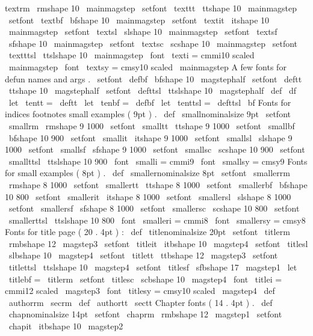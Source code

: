{{textrm
\
rmshape
{
10
}
{
\
mainmagstep
}
\
setfont
\
texttt
\
ttshape
{
10
}
{
\
mainmagstep
}
\
setfont
\
textbf
\
bfshape
{
10
}
{
\
mainmagstep
}
\
setfont
\
textit
\
itshape
{
10
}
{
\
mainmagstep
}
\
setfont
\
textsl
\
slshape
{
10
}
{
\
mainmagstep
}
\
setfont
\
textsf
\
sfshape
{
10
}
{
\
mainmagstep
}
\
setfont
\
textsc
\
scshape
{
10
}
{
\
mainmagstep
}
\
setfont
\
textttsl
\
ttslshape
{
10
}
{
\
mainmagstep
}
\
font
\
texti
=
cmmi10
scaled
\
mainmagstep
\
font
\
textsy
=
cmsy10
scaled
\
mainmagstep
%
A
few
fonts
for
defun
names
and
args
.
\
setfont
\
defbf
\
bfshape
{
10
}
{
\
magstephalf
}
\
setfont
\
deftt
\
ttshape
{
10
}
{
\
magstephalf
}
\
setfont
\
defttsl
\
ttslshape
{
10
}
{
\
magstephalf
}
\
def
\
df
{
\
let
\
tentt
=
\
deftt
\
let
\
tenbf
=
\
defbf
\
let
\
tenttsl
=
\
defttsl
\
bf
}
%
Fonts
for
indices
footnotes
small
examples
(
9pt
)
.
\
def
\
smallnominalsize
{
9pt
}
\
setfont
\
smallrm
\
rmshape
{
9
}
{
1000
}
\
setfont
\
smalltt
\
ttshape
{
9
}
{
1000
}
\
setfont
\
smallbf
\
bfshape
{
10
}
{
900
}
\
setfont
\
smallit
\
itshape
{
9
}
{
1000
}
\
setfont
\
smallsl
\
slshape
{
9
}
{
1000
}
\
setfont
\
smallsf
\
sfshape
{
9
}
{
1000
}
\
setfont
\
smallsc
\
scshape
{
10
}
{
900
}
\
setfont
\
smallttsl
\
ttslshape
{
10
}
{
900
}
\
font
\
smalli
=
cmmi9
\
font
\
smallsy
=
cmsy9
%
Fonts
for
small
examples
(
8pt
)
.
\
def
\
smallernominalsize
{
8pt
}
\
setfont
\
smallerrm
\
rmshape
{
8
}
{
1000
}
\
setfont
\
smallertt
\
ttshape
{
8
}
{
1000
}
\
setfont
\
smallerbf
\
bfshape
{
10
}
{
800
}
\
setfont
\
smallerit
\
itshape
{
8
}
{
1000
}
\
setfont
\
smallersl
\
slshape
{
8
}
{
1000
}
\
setfont
\
smallersf
\
sfshape
{
8
}
{
1000
}
\
setfont
\
smallersc
\
scshape
{
10
}
{
800
}
\
setfont
\
smallerttsl
\
ttslshape
{
10
}
{
800
}
\
font
\
smalleri
=
cmmi8
\
font
\
smallersy
=
cmsy8
%
Fonts
for
title
page
(
20
.
4pt
)
:
\
def
\
titlenominalsize
{
20pt
}
\
setfont
\
titlerm
\
rmbshape
{
12
}
{
\
magstep3
}
\
setfont
\
titleit
\
itbshape
{
10
}
{
\
magstep4
}
\
setfont
\
titlesl
\
slbshape
{
10
}
{
\
magstep4
}
\
setfont
\
titlett
\
ttbshape
{
12
}
{
\
magstep3
}
\
setfont
\
titlettsl
\
ttslshape
{
10
}
{
\
magstep4
}
\
setfont
\
titlesf
\
sfbshape
{
17
}
{
\
magstep1
}
\
let
\
titlebf
=
\
titlerm
\
setfont
\
titlesc
\
scbshape
{
10
}
{
\
magstep4
}
\
font
\
titlei
=
cmmi12
scaled
\
magstep3
\
font
\
titlesy
=
cmsy10
scaled
\
magstep4
\
def
\
authorrm
{
\
secrm
}
\
def
\
authortt
{
\
sectt
}
%
Chapter
fonts
(
14
.
4pt
)
.
\
def
\
chapnominalsize
{
14pt
}
\
setfont
\
chaprm
\
rmbshape
{
12
}
{
\
magstep1
}
\
setfont
\
chapit
\
itbshape
{
10
}
{
\
magstep2
}}}
